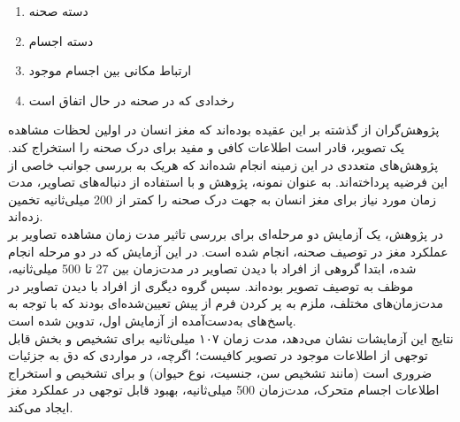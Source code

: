 \begin{enumerate}
\item دسته‌ صحنه
\item دسته‌ اجسام
\item ارتباط مکانی بین اجسام موجود
\item رخدادی که در صحنه در حال اتفاق است
\end{enumerate}

پژوهش‌گران از گذشته بر این عقیده بوده‌اند که مغز انسان در اولین لحظات مشاهده یک تصویر، قادر است اطلاعات کافی و مفید برای درک صحنه را استخراج کند. پژوهش‌های متعددی در این زمینه انجام شده‌اند که هریک به بررسی جوانب خاصی از این فرضیه پرداخته‌اند. به عنوان نمونه، پژوهش\cite{potter1976short}
و 
\cite{potter2002recognition} 
با استفاده از دنباله‌های تصاویر، مدت زمان مورد نیاز برای مغز انسان به جهت درک صحنه را کمتر از 200 میلی‌ثانیه تخمین زده‌اند.
\\
در پژوهش\cite{fei2007we}، یک آزمایش دو مرحله‌ای برای بررسی تاثیر مدت زمان مشاهده تصاویر بر عملکرد مغز در توصیف صحنه، انجام شده است. در این آزمایش که در دو مرحله انجام شده، ابتدا گروهی از افراد با دیدن تصاویر در مدت‌زمان بین 27 تا 500 میلی‌ثانیه، موظف به توصیف تصویر بوده‌اند. سپس گروه دیگری از افراد با دیدن تصاویر در مدت‌زمان‌های مختلف، ملزم به پر کردن فرم از پیش تعیین‌شده‌ای بودند که با توجه به پاسخ‌های به‌دست‌آمده از آزمایش اول، تدوین شده است.
\\
نتایج این آزمایشات نشان می‌دهد، مدت زمان ۱۰۷ میلی‌ثانیه برای تشخیص و بخش قابل توجهی از اطلاعات موجود در تصویر کافیست؛ اگرچه، در مواردی که دق به جزئیات ضروری است‌ (مانند تشخیص سن، جنسیت، نوع حیوان) و برای تشخیص و استخراج اطلاعات اجسام متحرک، مدت‌زمان 500 میلی‌ثانیه، بهبود قابل توجهی در عملکرد مغز ایجاد می‌کند.